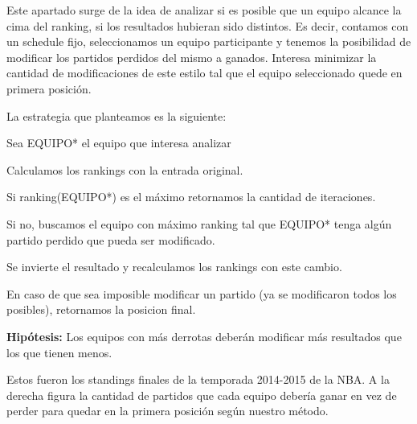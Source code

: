 Este apartado surge de la idea de analizar si es posible que un equipo alcance la cima del ranking, si los resultados hubieran sido distintos. Es decir, contamos con un schedule fijo, seleccionamos un equipo participante y tenemos la posibilidad de modificar los partidos perdidos del mismo a ganados. Interesa minimizar la cantidad de modificaciones de este estilo tal que el equipo seleccionado quede en primera posici\'on.

La estrategia que planteamos es la siguiente:

Sea EQUIPO* el equipo que interesa analizar

Calculamos los rankings con la entrada original.

Si ranking(EQUIPO*) es el m\'aximo retornamos la cantidad de iteraciones.

Si no, buscamos el equipo con m\'aximo ranking tal que EQUIPO* tenga alg\'un partido perdido que pueda ser modificado.

Se invierte el resultado y recalculamos los rankings con este cambio.

En caso de que sea imposible modificar un partido (ya se modificaron todos los posibles), retornamos la posicion final.

\textbf{Hip\'otesis:} Los equipos con m\'as derrotas deber\'an modificar m\'as resultados que los que tienen menos.

Estos fueron los standings finales de la temporada 2014-2015 de la NBA. A la derecha figura la cantidad de partidos que cada equipo deber\'ia ganar en vez de perder para quedar en la primera posici\'on seg\'un nuestro m\'etodo. \\

